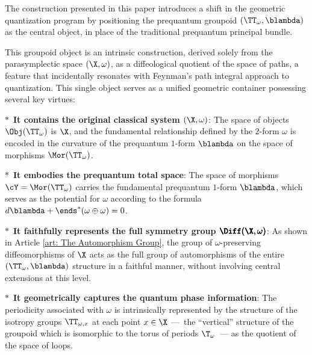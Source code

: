   
  \begin{article}
    \label{art: On the System}
    
    The construction presented in this paper introduces a shift in the geometric quantization program by positioning the prequantum groupoid $(\TT_\omega, \blambda)$ as the central object,
    in place of the traditional prequantum principal bundle.
    
    This groupoid object is an intrinsic construction,
    derived solely from the parasymplectic space $(\X, \omega)$,
    as a diffeological quotient of the space of paths,
    a feature that incidentally resonates with Feynman's path integral approach to quantization.
    This single object serves as a unified geometric container possessing several key virtues:
    
    $\ast$~\textbf{It contains the original classical system $(\X, \omega)$}:
    The space of objects $\Obj(\TT_\omega)$ is $\X$,
    and the fundamental relationship defined by the $2$-form $\omega$ is encoded in the curvature of the prequantum $1$-form $\blambda$ on the space of morphisms $\Mor(\TT_\omega)$.
    
    $\ast$~\textbf{It embodies the prequantum total space}:
    The space of morphisms $\cY = \Mor(\TT_\omega)$ carries the fundamental prequantum $1$-form $\blambda$,
    which serves as the potential for $\omega$ according to the formula $d\blambda + \ends^*(\omega \oplus \omega) = 0$.
    
    $\ast$~\textbf{It faithfully represents the full symmetry group $\pmb{\Diff(\X, \omega)}$}:
    As shown in Article \ref{art: The Automorphism Group},
    the group of $\omega$-preserving diffeomorphisms of $\X$ acts as the full group of automorphisms of the entire $(\TT_\omega, \blambda)$ structure in a faithful manner,
    without involving central extensions at this level.
    
    $\ast$~\textbf{It geometrically captures the quantum phase information}:
    The periodicity associated with $\omega$ is intrinsically represented by the structure of the isotropy groups $\TT_{\omega,x}$ at each point $x \in \X$
    ---~the ``vertical'' structure of the groupoid which is isomorphic to the torus of periods $\T_\omega$~---
    as the quotient of the space of loops.
    
  \end{article}
  
